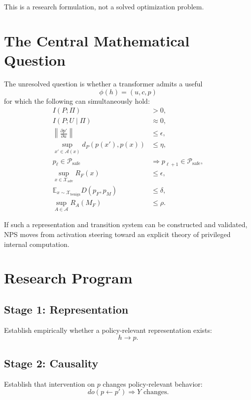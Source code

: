 \documentclass[11pt]{article}
\newcommand{\X}{\mathcal{X}}
\newcommand{\A}{\mathcal{A}}
\newcommand{\Psafe}{\mathcal{P}_{\mathrm{safe}}}
\newcommand{\E}{\mathbb{E}}
\begin{document}
This is a research formulation, not a solved optimization problem.

\section{The Central Mathematical Question}

The unresolved question is whether a transformer admits a useful
\begin{equation}
\phi(h)=(u,c,p)
\end{equation}
for which the following can simultaneously hold:
\begin{align}
I(P;\Pi)&>0,\\
I(P;U\mid\Pi)&\approx0,\\
\left\|\frac{\partial p'}{\partial u}\right\|&\leq\epsilon,\\
\sup_{x'\in\A(x)}d_P(p(x'),p(x))&\leq\eta,\\
p_\ell\in\Psafe&\Rightarrow p_{\ell+1}\in\Psafe,\\
\sup_{x\in\X_{\mathrm{adv}}}R_F(x)&\leq\epsilon,\\
\E_{x\sim\X_{\mathrm{benign}}}D(p_F,p_M)&\leq\delta,\\
\sup_{A\in\mathcal A}R_A(M_F)&\leq\rho.
\end{align}

If such a representation and transition system can be constructed and
validated, NPS moves from activation steering toward an explicit theory of
privileged internal computation.

\section{Research Program}

\subsection{Stage 1: Representation}
Establish empirically whether a policy-relevant representation exists:
\begin{equation}
h\rightarrow p.
\end{equation}

\subsection{Stage 2: Causality}
Establish that intervention on $p$ changes policy-relevant behavior:
\begin{equation}
do(p\leftarrow p')\Longrightarrow Y\text{ changes}.
\end{equation}
\end{document}
